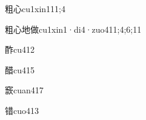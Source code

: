 \begin{verbete}{粗心}{cu1xin1}{11;4}
\end{verbete}
\begin{verbete}{粗心地做}{cu1xin1·di4·zuo4}{11;4;6;11}
\end{verbete}
\begin{verbete}{酢}{cu4}{12}
\end{verbete}
\begin{verbete}{醋}{cu4}{15}
\end{verbete}
\begin{verbete}{窾}{cuan4}{17}
\end{verbete}
\begin{verbete}{错}{cuo4}{13}
\end{verbete}

